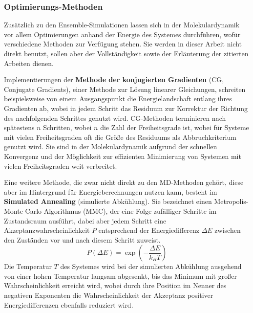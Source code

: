 \subsubsection{Optimierungs-Methoden}
\label{conjugategradient}
\label{annealing}

Zusätzlich zu den Ensemble-Simulationen lassen sich in der Molekulardynamik vor allem Optimierungen anhand der Energie des Systemes durchführen, wofür verschiedene Methoden zur Verfügung stehen.
Sie werden in dieser Arbeit nicht direkt benutzt, sollen aber der Vollständigkeit sowie der Erläuterung der zitierten Arbeiten dienen.

Implementierungen der \textbf{Methode der konjugierten Gradienten} (CG, Conjugate Gradients)\cite{press_numerical_2007}, einer Methode zur Lösung linearer Gleichungen, schreiten beispielsweise von einem Ausgangspunkt die Energielandschaft entlang ihres Gradienten ab, wobei in jedem Schritt das Residuum zur Korrektur der Richtung des nachfolgenden Schrittes genutzt wird.
CG-Methoden terminieren nach spätestens $n$ Schritten, wobei $n$ die Zahl der Freiheitsgrade ist, wobei für Systeme mit vielen Freiheitsgraden oft die Größe des Residuums als Abbruchkriterium genutzt wird.
Sie sind in der Molekulardynamik aufgrund der schnellen Konvergenz und der Möglichkeit zur effizienten Minimierung von Systemen mit vielen Freiheitsgraden weit verbreitet.

Eine weitere Methode, die zwar nicht direkt zu den MD-Methoden gehört, diese aber im Hintergrund für Energieberechnungen nutzen kann, besteht im \textbf{Simulated Annealing} (simulierte Abkühlung)\cite{press_numerical_2007}.
Sie bezeichnet einen Metropolis-Monte-Carlo-Algorithmus (MMC), der eine Folge zufälliger Schritte im Zustandsraum ausführt, dabei aber jedem Schritt eine Akzeptanzwahrscheinlichkeit $P$ entsprechend der Energiedifferenz $\Delta E$ zwischen den Zuständen vor und nach diesem Schritt zuweist.
\begin{equation}
  P(\Delta E) = \exp(-\frac{\Delta E}{k_B T})
\end{equation}
Die Temperatur $T$ des Systemes wird bei der simulierten Abkühlung ausgehend von einer hohen Temperatur langsam abgesenkt, bis das Minimum mit großer Wahrscheinlichkeit erreicht wird, wobei durch ihre Position im Nenner des negativen Exponenten die Wahrscheinlichkeit der Akzeptanz positiver Energiedifferenzen ebenfalls reduziert wird.



